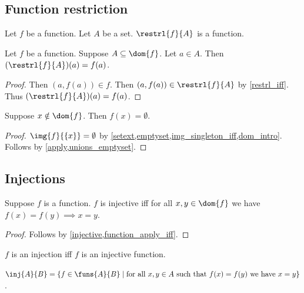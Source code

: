 \subsection{Function restriction}

\begin{proposition}\label{restrl_of_function_is_function}
    Let $f$ be a function.
    Let $A$ be a set.
    $\restrl{f}{A}$ is a function.
\end{proposition}

\begin{proposition}\label{restrl_of_function_apply}
    Let $f$ be a function.
    Suppose $A\subseteq\dom{f}$.
    Let $a\in A$.
    Then $(\restrl{f}{A})(a) = f(a)$.
\end{proposition}
\begin{proof}
    Then $(a,f(a))\in f$.
    Then $(a,f(a))\in \restrl{f}{A}$ by \cref{restrl_iff}.
    Thus $(\restrl{f}{A})(a) = f(a)$.
\end{proof}

\begin{proposition}\label{function_apply_default}
    Suppose $x\notin\dom{f}$.
    Then $f(x) = \emptyset$.
\end{proposition}
\begin{proof}
    $\img{f}{\{x\}} = \emptyset$ by \cref{setext,emptyset,img_singleton_iff,dom_intro}.
    Follows by \cref{apply,unions_emptyset}.
\end{proof}



\subsection{Injections}

\begin{proposition}\label{injective_function}
    Suppose $f$ is a function.
    $f$ is injective iff for all $x,y\in\dom{f}$ we have $f(x) = f(y) \implies x = y$.
\end{proposition}
\begin{proof}
    Follows by \cref{injective,function_apply_iff}.
\end{proof}

\begin{abbreviation}\label{injection}
    $f$ is an injection iff $f$ is an injective function.
\end{abbreviation}

\begin{definition}\label{inj}
    $\inj{A}{B} = \{f\in\funs{A}{B}\mid \text{for all $x,y\in A$ such that $f(x)=f(y)$ we have $x = y$}\}$.
\end{definition}

